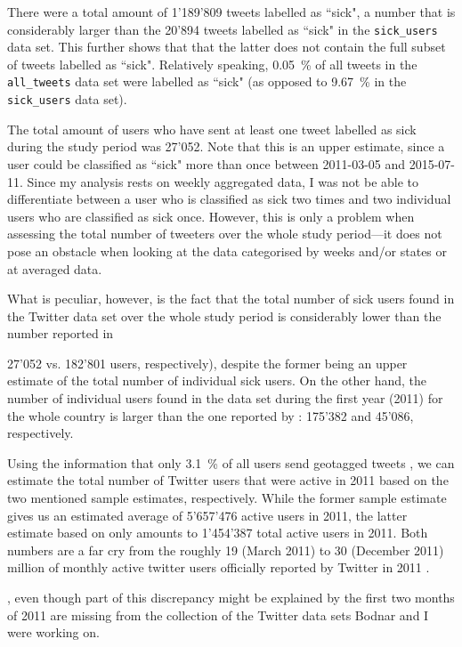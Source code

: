 \documentclass[11pt, a4paper,twoside]{report}\usepackage[]{graphicx}\usepackage[]{color}
\begin{document}
There were a total amount of 1'189'809 tweets labelled as ``sick", a number that is considerably larger than the 20'894 tweets labelled as ``sick" in the \texttt{sick\_users} data set. This further shows that that the latter does not contain the full subset of tweets labelled as ``sick". Relatively speaking, 0.05~\% of all tweets in the \texttt{all\_tweets} data set were labelled as ``sick" (as opposed to 9.67~\% in the \texttt{sick\_users} data set).

The total amount of users who have sent at least one tweet labelled as sick during the study period was 27'052. Note that this is an upper estimate, since a user could be classified as ``sick" more than once between 2011-03-05 and 2015-07-11. Since my analysis rests on weekly aggregated data, I was not be able to differentiate between a user who is classified as sick two times and two individual users who are classified as sick once. However, this is only a problem when assessing the total number of tweeters over the whole study period---it does not pose an obstacle when looking at the data categorised by weeks and/or states or at averaged data.

What is peculiar, however, is the fact that the total number of sick users found in the Twitter data set over the whole study period is considerably lower than the number reported in \cite{bodnar_data_2015} {27'052 vs. 182'801 users, respectively), despite the former being an upper estimate of the total number of individual sick users. On the other hand, the number of individual users found in the data set during the first year (2011) for the whole country is larger than the one reported by \cite{bodnar_data_2015}: 175'382 and 45'086, respectively.

Using the information that only 3.1~\% of all users send geotagged tweets \citep{sloan2013knowing}, we can estimate the total number of Twitter users that were active in 2011 based on the two mentioned sample estimates, respectively. While the former sample estimate gives us an estimated average of 5'657'476 active users in 2011, the latter estimate based on \cite{bodnar_data_2015} only amounts to 1'454'387 total active users in 2011. Both numbers are a far cry from the roughly 19 (March 2011) to 30 (December 2011) million of monthly active twitter users officially reported by Twitter in 2011 \citep{twitter_annual_2013}.}, even though part of this discrepancy might be explained by the first two months of 2011 are missing from the collection of the Twitter data sets Bodnar and I were working on.
\end{document}
